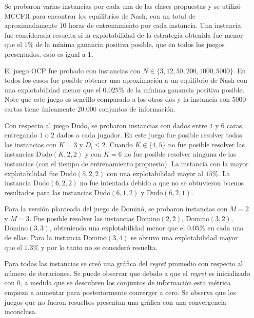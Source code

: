 Se probaron varias instancias por cada una de las clases propuestas y se utilizó MCCFR para encontrar los equilibrios de Nash, con un total de aproximadamente $10$ horas de entrenamiento por cada instancia. Una instancia fue considerada resuelta si la explotabilidad de la estrategia obtenida fue menor que el $1\%$ de la mínima ganancia positiva posible, que en todos los juegos presentados, esto es igual a $1$.

El juego OCP fue probado con instancias con $N \in \{ 3, 12, 50, 200, 1000, 5000\}$. En todos los casos fue posible obtener una aproximación a un equilibrio de Nash con una explotabilidad menor que el $0.025\%$ de la mínima ganancia positiva posible. Note que este juego es sencillo comparado a los otros dos y la instancia con $5000$ cartas tiene únicamente $20.000$ conjuntos de información.

Con respecto al juego Dudo, se probaron instancias con dados entre $4$ y $6$ caras, entregando $1$ o $2$ dados a cada jugador. En este juego fue posible resolver todas las instancias con $K = 3$ y $D_i \leq 2$. Cuando $K \in \{4, 5\}$ no fue posible resolver las instancias Dudo$(K, 2, 2)$ y con $K = 6$ no fue posible resolver ninguna de las instancias (con el tiempo de entrenamiento propuesto). La instancia con la mayor explotabilidad fue Dudo$(5, 2, 2)$ con una explotabilidad mayor al $15\%$. La instancia Dudo$(6, 2, 2)$ no fue intentada debido a que no se obtuvieron buenos resultados para las instancias Dudo$(6, 1, 2)$ y Dudo$(6, 2, 1)$.

Para la versión planteada del juego de Dominó, se probaron instancias con $M = 2$ y $M = 3$. Fue posible resolver las instancias Domino$(2, 2)$, Domino$(3, 2)$, Domino$(3, 3)$, obteniendo una explotabilidad menor que el $0.05\%$ en cada una de ellas. Para la instancia Domino$(3, 4)$ se obtuvo una explotabilidad mayor que el $1.3\%$ y por lo tanto no se consideró resuelta.

Para todas las instancias se creó una gráfica del \textit{regret} promedio con respecto al número de iteraciones. Se puede observar que debido a que el \textit{regret} es inicializado con $0$, a medida que se descubren los conjuntos de información esta métrica empieza a aumentar para posteriormente converger a cero. Se observa que los juegos que no fueron resueltos presentan una gráfica con una convergencia inconclusa.

